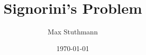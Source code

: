 \documentclass[11pt,a4paper]{article}
\begin{document}
\title{Signorini's Problem}
\author{Max Stuthmann}
\date{\today}
\maketitle
\tableofcontents


\newpage

\newpage

\newpage

\newpage

\newpage

\newpage


\newpage
\renewcommand{\thesection}{\Alph{section}}
\setcounter{page}{1}
\setcounter{section}{0}


\listoffigures
\end{document}
